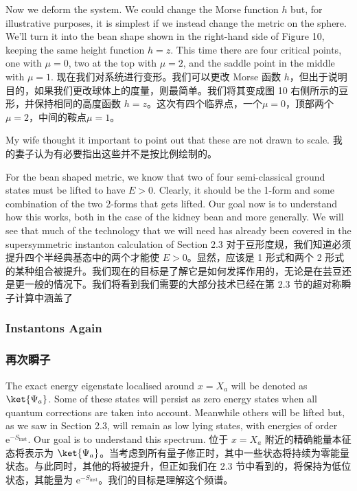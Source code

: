 \documentclass{article}
\newcommand{\rme}{\mathrm{e}}
\begin{document}
\begin{paracol}{2}
Now we deform the system. We could change the Morse function $h$ but, for illustrative purposes, it is simplest if we instead change the metric on the sphere. We’ll turn it into the bean shape shown in the right-hand side of Figure 10, keeping the same height function $h = z$. This time there are four critical points, one with $\mu = 0$, two at the top with $\mu = 2$, and the saddle point in the middle with $\mu = 1$.
\switchcolumn
现在我们对系统进行变形。我们可以更改 Morse 函数 $h$，但出于说明目的，如果我们更改球体上的度量，则最简单。我们将其变成图 10 右侧所示的豆形，并保持相同的高度函数 $h = z$。这次有四个临界点，一个$\mu = 0$，顶部两个$\mu = 2$，中间的鞍点$\mu = 1$。
\switchcolumn*

My wife thought it important to point out that these are not drawn to scale.
\switchcolumn
我的妻子认为有必要指出这些并不是按比例绘制的。
\switchcolumn*

For the bean shaped metric, we know that two of four semi-classical ground states must be lifted to have $E > 0$. Clearly, it should be the 1-form and some combination of the two 2-forms that gets lifted. Our goal now is to understand how this works, both in the case of the kidney bean and more generally. We will see that much of the technology that we will need has already been covered in the supersymmetric instanton calculation of Section 2.3
\switchcolumn
对于豆形度规，我们知道必须提升四个半经典基态中的两个才能使 $E > 0$。显然，应该是 1 形式和两个 2 形式的某种组合被提升。我们现在的目标是了解它是如何发挥作用的，无论是在芸豆还是更一般的情况下。我们将看到我们需要的大部分技术已经在第 2.3 节的超对称瞬子计算中涵盖了
\switchcolumn*

\subsubsection{Instantons Again}
\switchcolumn
\subsubsection*{再次瞬子}
\switchcolumn*

The exact energy eigenstate localised around $x = X_a$ will be denoted as $\ket{\Psi_a}$. Some of these states will persist as zero energy states when all quantum corrections are taken into account. Meanwhile others will be lifted but, as we saw in Section 2.3, will remain as low lying states, with energies of order $\rme^{- S_{\text{inst}}}$. Our goal is to understand this spectrum.
\switchcolumn
位于 $x = X_a$ 附近的精确能量本征态将表示为 $\ket{\Psi_a}$。当考虑到所有量子修正时，其中一些状态将持续为零能量状态。与此同时，其他的将被提升，但正如我们在 2.3 节中看到的，将保持为低位状态，其能量为 $\rme^{- S_{\text{inst}}}$。我们的目标是理解这个频谱。
\switchcolumn*


\end{paracol}
\end{document}
